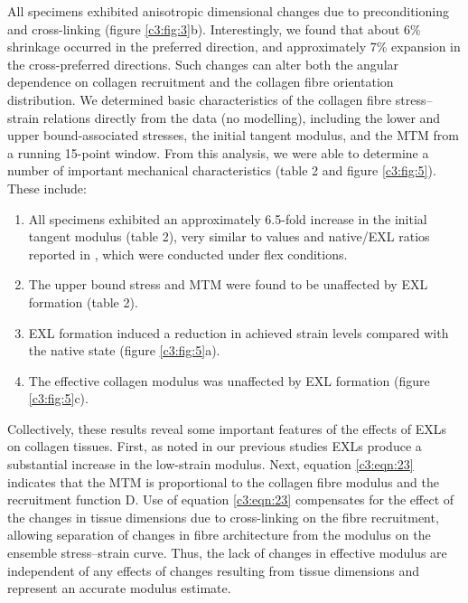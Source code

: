     All specimens exhibited anisotropic dimensional changes due to preconditioning and cross-linking (figure \ref{c3:fig:3}b). Interestingly, we found that about 6\% shrinkage occurred in the preferred direction, and approximately 7\% expansion in the cross-preferred directions. Such changes can alter both the angular dependence on collagen recruitment and the collagen fibre orientation distribution. We determined basic characteristics of the collagen fibre stress–strain relations directly from the data (no modelling), including the lower and upper bound-associated stresses, the initial tangent modulus, and the MTM from a running 15-point window. From this analysis, we were able to determine a number of important mechanical characteristics (table 2 and figure \ref{c3:fig:5}). These include:
        \begin{enumerate}
            \item All specimens exhibited an approximately 6.5-fold increase in the initial tangent modulus (table 2), very similar to values and native/EXL ratios reported in \cite{mirnajafi_effects_2005}, which were conducted under flex conditions.
            \item The upper bound stress and MTM were found to be unaffected by EXL formation (table 2).
            \item EXL formation induced a reduction in achieved strain levels compared with the native state (figure \ref{c3:fig:5}a).
            \item The effective collagen modulus was unaffected by EXL formation (figure \ref{c3:fig:5}c).
        \end{enumerate}
    Collectively, these results reveal some important features of the effects of EXLs on collagen tissues. First, as noted in our previous studies \cite{sacks_structural_2000,mirnajafi_effects_2005} EXLs produce a substantial increase in the low-strain modulus. Next, equation \ref{c3:eqn:23} indicates that the MTM is proportional to the collagen fibre modulus and the recruitment function D. Use of equation \ref{c3:eqn:23} compensates for the effect of the changes in tissue dimensions due to cross-linking on the fibre recruitment, allowing separation of changes in fibre architecture from the modulus on the ensemble stress–strain curve. Thus, the lack of changes in effective modulus are independent of any effects of changes resulting from tissue dimensions and represent an accurate modulus estimate.
    
    
    